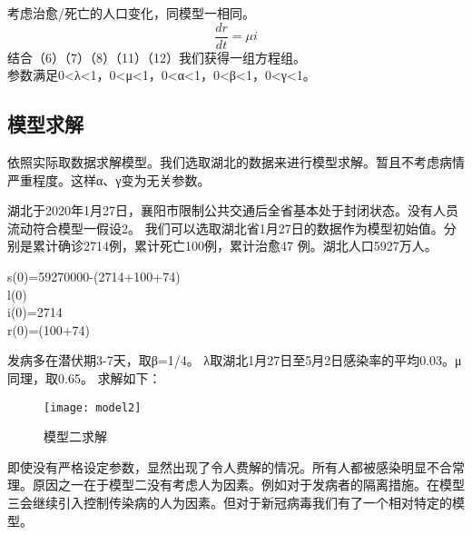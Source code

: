 \documentclass[withoutpreface,bwprint]{cumcmthesis} %
\begin{document}
考虑治愈/死亡的人口变化，同模型一相同。
    \begin{equation}\label{qua:012}
        \frac{dr}{dt}=\mu i
    \end{equation}
结合（6）（7）（8）（11）（12）我们获得一组方程组。\\
参数满足0<λ<1，0<μ<1，0<α<1，0<β<1，0<γ<1。
\subsection{模型求解}
依照实际取数据求解模型。我们选取湖北的数据来进行模型求解。暂且不考虑病情严重程度。这样α、γ变为无关参数。
\par
湖北于2020年1月27日，襄阳市限制公共交通后全省基本处于封闭状态。没有人员流动符合模型一假设2\cite{ref3}。
我们可以选取湖北省1月27日的数据作为模型初始值。分别是累计确诊2714例，累计死亡100例，累计治愈47 例。湖北人口5927万人\cite{ref4}。

\begin{center}
s(0)=59270000-(2714+100+74)\\l(0)\\i(0)=2714\\r(0)=(100+74)
\end{center}
\par

发病多在潜伏期3-7天，取β=1/4\cite{ref2}。
λ取湖北1月27日至5月2日感染率的平均0.03。μ同理，取0.65。
求解如下：
    \begin{figure}[!h]
        \centering
        \texttt{[image: model2]}
        \caption{模型二求解}
        \label{fig:ana2_flow}
    \end{figure}
即使没有严格设定参数，显然出现了令人费解的情况。所有人都被感染明显不合常理。原因之一在于模型二没有考虑人为因素。例如对于发病者的隔离措施。在模型三会继续引入控制传染病的人为因素。但对于新冠病毒我们有了一个相对特定的模型。
\newpage
\end{document}
